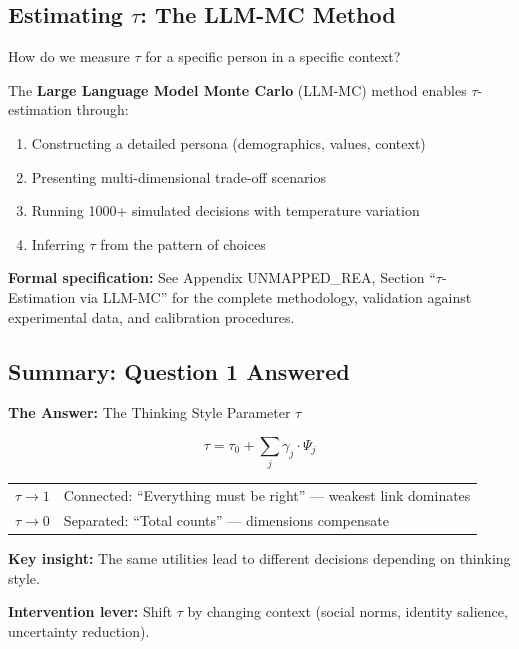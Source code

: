 \subsection{Estimating $\tau$: The LLM-MC Method}
\label{subsec:12-2-estimation}

How do we measure $\tau$ for a specific person in a specific context?

\begin{note}
The \textbf{Large Language Model Monte Carlo} (LLM-MC) method enables 
$\tau$-estimation through:
\begin{enumerate}
\item Constructing a detailed persona (demographics, values, context)
\item Presenting multi-dimensional trade-off scenarios
\item Running 1000+ simulated decisions with temperature variation
\item Inferring $\tau$ from the pattern of choices
\end{enumerate}
\end{note}

\textbf{Formal specification:} See Appendix UNMAPPED_REA, Section ``$\tau$-Estimation 
via LLM-MC'' for the complete methodology, validation against experimental 
data, and calibration procedures.

\subsection{Summary: Question 1 Answered}
\label{subsec:12-2-summary}

\begin{tcolorbox}[
  colback=blue!3,
  colframe=blue!50!black,
  title={\textbf{Question 1: How Does the Person Think?}},
  fonttitle=\bfseries\sffamily
]

\textbf{The Answer:} The Thinking Style Parameter $\tau$

\begin{equation*}
\tau = \tau_0 + \sum_j \gamma_j \cdot \Psi_j
\end{equation*}

\begin{tabular}{lp{9cm}}
$\tau \to 1$ & Connected: ``Everything must be right'' — weakest link dominates\\
$\tau \to 0$ & Separated: ``Total counts'' — dimensions compensate\\
\end{tabular}

\vspace{6pt}
\textbf{Key insight:} The same utilities lead to different decisions 
depending on thinking style.

\textbf{Intervention lever:} Shift $\tau$ by changing context 
(social norms, identity salience, uncertainty reduction).

\end{tcolorbox}

